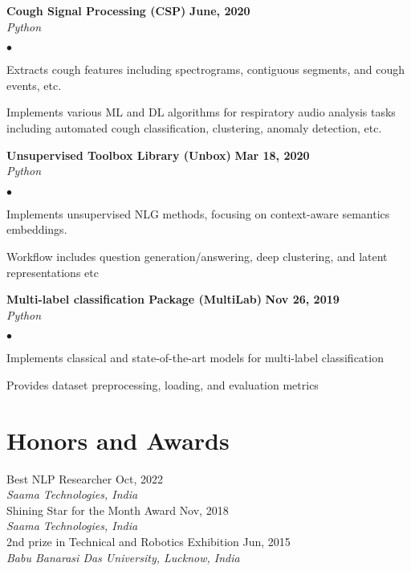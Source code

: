 \documentclass[margin,line]{res}
\newenvironment{list2}{
  \begin{list}{$\bullet$}{%
      \setlength{\itemsep}{0in}
      \setlength{\parsep}{0in} \setlength{\parskip}{0in}
      \setlength{\topsep}{0in} \setlength{\partopsep}{0in} 
      \setlength{\leftmargin}{0.2in}}}{\end{list}}
\begin{document}
\begin{resume}
{{\textbf{Cough Signal Processing (CSP)} \hfill {\bf{June, 2020}}}}\\
{\em Python} \hfill {\href{https://github.com/coughresearch/Cough-signal-processing}{\color{blue}{\textbf{[Github]}}}}

\begin{list2}
\item Extracts cough features including spectrograms, contiguous segments, and cough events, etc.
\item Implements various ML and DL algorithms for respiratory audio analysis tasks including automated cough classification, clustering, anomaly detection, etc.
\end{list2}

{\textbf{Unsupervised Toolbox Library (Unbox)} \hfill {\bf{Mar 18, 2020}}}\\
{\em Python} \hfill {\href{https://github.com/monk1337/Unbox/tree/master}{\color{blue}{\textbf{[Github]}}}}

\begin{list2}
\item Implements unsupervised NLG methods, focusing on context-aware semantics embeddings.
\item Workflow includes question generation/answering, deep clustering, and latent representations etc
\end{list2}

{\textbf{Multi-label classification Package (MultiLab)} \hfill {\bf {Nov 26, 2019}}}\\
{\em Python} \hfill {\href{https://github.com/monk1337/MultiLab}{\color{blue}{\textbf{[Github]}}}}

\begin{list2}

\item Implements classical and state-of-the-art models for multi-label classification
\item Provides dataset preprocessing, loading, and evaluation metrics
\end{list2}

\section{\sc Honors and Awards}
{Best NLP Researcher \hfill {Oct, 2022}}\\
{\em Saama Technologies, India }
\vspace*{.3cm}\\
{Shining Star for the Month Award \hfill {Nov, 2018}}\\
{\em Saama Technologies, India }
\vspace*{.3cm}\\
{2nd prize in Technical and Robotics Exhibition \hfill  {Jun, 2015}}\\
{\em Babu Banarasi Das University, Lucknow, India }


\end{resume}
\end{document}
